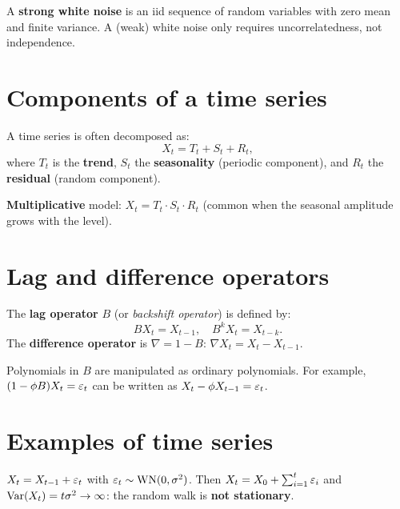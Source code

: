 \begin{definition}
A \textbf{strong white noise} is an iid sequence of random variables with zero mean and finite variance. A (weak) white noise only requires uncorrelatedness, not independence.
\end{definition}

\section{Components of a time series}

\begin{definition}
A time series is often decomposed as:
\[
X_t = T_t + S_t + R_t,
\]
where $T_t$ is the \textbf{trend}, $S_t$ the \textbf{seasonality} (periodic component), and $R_t$ the \textbf{residual} (random component).

\textbf{Multiplicative} model: $X_t = T_t\cdot S_t\cdot R_t$ (common when the seasonal amplitude grows with the level).
\end{definition}

\section{Lag and difference operators}

\begin{definition}
The \textbf{lag operator} $B$ (or \emph{backshift operator}) is defined by:
\[
BX_t = X_{t-1}, \quad B^k X_t = X_{t-k}.
\]
The \textbf{difference operator} is $\nabla = 1-B$: $\nabla X_t = X_t - X_{t-1}$.
\end{definition}

\begin{remark}
Polynomials in $B$ are manipulated as ordinary polynomials. For example, $(1-\phi B)X_t = \varepsilon_t$ can be written as $X_t - \phi X_{t-1} = \varepsilon_t$.
\end{remark}

\section{Examples of time series}

\begin{example}
$X_t = X_{t-1} + \varepsilon_t$ with $\varepsilon_t\sim\mathrm{WN}(0,\sigma^2)$. Then $X_t = X_0 + \sum_{i=1}^t \varepsilon_i$ and $\operatorname{Var}(X_t) = t\sigma^2 \to \infty$: the random walk is \textbf{not stationary}.
\end{example}

